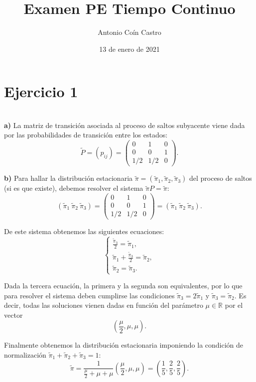 \documentclass[12pt]{article}
\author{Antonio Coín Castro}
\date{13 de enero de 2021}
\title{Examen PE Tiempo Continuo}
\begin{document}
\maketitle

\section*{Ejercicio 1}\\

\textbf{a)} La matriz de transición asociada al proceso de saltos subyacente viene dada por las probabilidades de transición entre los estados:
\[
\tilde P = (p_{ij}) =\begin{pmatrix}
  0 & 1 & 0\\
  0 & 0 & 1\\
  1/2 & 1/2 & 0
\end{pmatrix}.
\]

\textbf{b)} Para hallar la distribución estacionaria $\tilde \pi=(\tilde \pi_1, \tilde \pi_2,\tilde \pi_3)$ del proceso de saltos (si es que existe), debemos resolver el sistema $\tilde \pi P=\tilde \pi$:
\[
(\tilde \pi_1 \ \tilde \pi_2 \ \tilde \pi_3)=\begin{pmatrix}
  0 & 1 & 0\\
  0 & 0 & 1\\
  1/2 & 1/2 & 0
\end{pmatrix}=(\tilde \pi_1 \ \tilde \pi_2 \ \tilde \pi_3).
\]

De este sistema obtenemos las siguientes ecuaciones:
\[
\begin{cases}
  \displaystyle
  \frac{\tilde \pi_3}{2} = \tilde \pi_1,\\
  \displaystyle \tilde \pi_1 + \frac{\tilde \pi_3}{2}=\tilde \pi_2,\\
  \tilde \pi_2 = \tilde \pi_3.
\end{cases}
\]

Dada la tercera ecuación, la primera y la segunda son equivalentes, por lo que para resolver el sistema deben cumplirse las condiciones $\tilde \pi_3 = 2\tilde \pi_1$ y $\tilde \pi_3=\tilde \pi_2$. Es decir, todas las soluciones vienen dadas en función del parámetro $\mu \in \mathbb R$ por el vector
\[
\left(\frac{\mu}{2}, \mu, \mu\right).
\]

Finalmente obtenemos la distribución estacionaria imponiendo la condición de normalización $\tilde \pi_1 + \tilde \pi_2 + \tilde \pi_3 = 1$:
\[
\tilde \pi = \frac{1}{\frac{\mu}{2} + \mu + \mu}\left(\frac{\mu}{2}, \mu, \mu\right) = \left( \frac{1}{5}, \frac{2}{5},\frac{2}{5}\right).
\]
\end{document}
